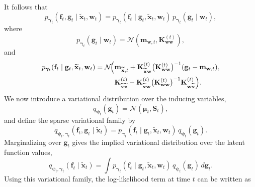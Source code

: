 It follows that
\[
p_{\boldsymbol{\gamma}_t}(\mathbf{f}_t,\mathbf{g}_t
\mid \widetilde{\mathbf{x}}_t,\mathbf{w}_t)
=
p_{\boldsymbol{\gamma}_t}(\mathbf{f}_t
\mid \mathbf{g}_t,\widetilde{\mathbf{x}}_t,\mathbf{w}_t)\,
p_{\boldsymbol{\gamma}_t}(\mathbf{g}_t\mid \mathbf{w}_t),
\]
where
\[
p_{\boldsymbol{\gamma}_t}(\mathbf{g}_t\mid \mathbf{w}_t)
=
\mathcal{N}\!\left(\mathbf{m}_{\mathbf{w},t},\mathbf{K}^{(t)}_{\mathbf{w}\mathbf{w}}\right),
\]
and
\begin{align}
p_{\boldsymbol{\gamma}_t}(\mathbf{f}_t
\mid \mathbf{g}_t,\widetilde{\mathbf{x}}_t,\mathbf{w}_t)
=
\mathcal{N}\!\Bigl(
&\mathbf{m}_{\widetilde{\mathbf{x}},t}
+
\mathbf{K}^{(t)}_{\widetilde{\mathbf{x}}\mathbf{w}}\bigl(\mathbf{K}^{(t)}_{\mathbf{w}\mathbf{w}}\bigr)^{-1}
(\mathbf{g}_t-\mathbf{m}_{\mathbf{w},t}),
\nonumber\\
&
\mathbf{K}^{(t)}_{\widetilde{\mathbf{x}}\widetilde{\mathbf{x}}}
-
\mathbf{K}^{(t)}_{\widetilde{\mathbf{x}}\mathbf{w}}\bigl(\mathbf{K}^{(t)}_{\mathbf{w}\mathbf{w}}\bigr)^{-1}\mathbf{K}^{(t)}_{\mathbf{w}\widetilde{\mathbf{x}}}
\Bigr).
\label{eq:f_conditional_u}
\end{align}
We now introduce a variational distribution over the inducing variables,
\[
q_{\boldsymbol{\psi}_t}(\mathbf{g}_t)
=
\mathcal{N}(\boldsymbol{\mu}_t,\mathbf{S}_t),
\]
and define the sparse variational family by
\[
q_{\boldsymbol{\psi}_t,\boldsymbol{\gamma}_t}(\mathbf{f}_t,\mathbf{g}_t\mid \widetilde{\mathbf{x}}_t)
=
p_{\boldsymbol{\gamma}_t}(\mathbf{f}_t\mid \mathbf{g}_t,\widetilde{\mathbf{x}}_t,\mathbf{w}_t)\,
q_{\boldsymbol{\psi}_t}(\mathbf{g}_t).
\]
Marginalizing over \(\mathbf{g}_t\) gives the implied variational distribution
over the latent function values,
\[
q_{\boldsymbol{\psi}_t,\boldsymbol{\gamma}_t}(\mathbf{f}_t\mid \widetilde{\mathbf{x}}_t)
=
\int
p_{\boldsymbol{\gamma}_t}(\mathbf{f}_t\mid \mathbf{g}_t,\widetilde{\mathbf{x}}_t,\mathbf{w}_t)\,
q_{\boldsymbol{\psi}_t}(\mathbf{g}_t)\,d\mathbf{g}_t.
\]
Using this variational family, the log-likelihood term at time \(t\) can be written as
